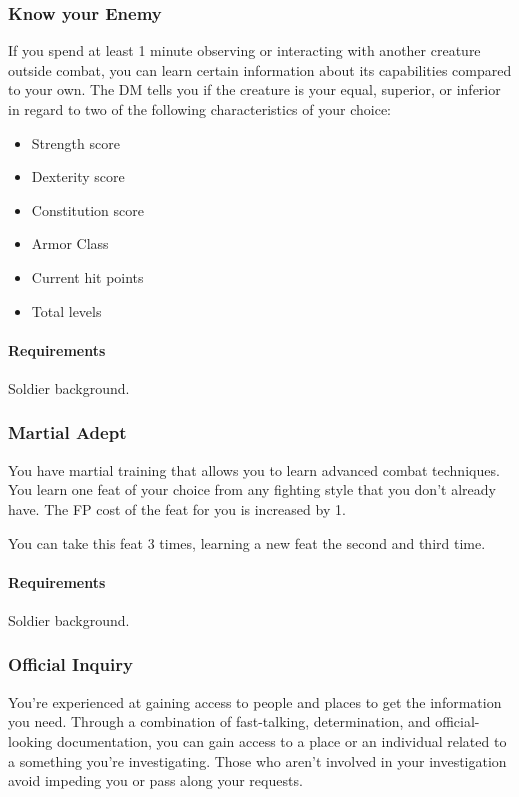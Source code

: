         \subsubsection{Know your Enemy} \label{feat::knowyourenemy}
            If you spend at least 1 minute observing or interacting with another creature outside combat, you can learn certain information about its capabilities compared to your own.
            The DM tells you if the creature is your equal, superior, or inferior in regard to two of the following characteristics of your choice:
            \begin{itemize}
                \item Strength score
                \item Dexterity score
                \item Constitution score
                \item Armor Class
                \item Current hit points
                \item Total levels
            \end{itemize}
            \paragraph{Requirements} Soldier background.
        \subsubsection{Martial Adept} \label{feat::martialadept}
            You have martial training that allows you to learn advanced combat techniques.
            You learn one feat of your choice from any fighting style that you don't already have.
            The FP cost of the feat for you is increased by 1.

            You can take this feat 3 times, learning a new feat the second and third time.
            \paragraph{Requirements} Soldier background.
        \subsubsection{Official Inquiry} \label{feat::officialinquiry}
            You're experienced at gaining access to people and places to get the information you need.
            Through a combination of fast-talking, determination, and official-looking documentation, you can gain access to a place or an individual related to a something you're investigating.
            Those who aren't involved in your investigation avoid impeding you or pass along your requests.
